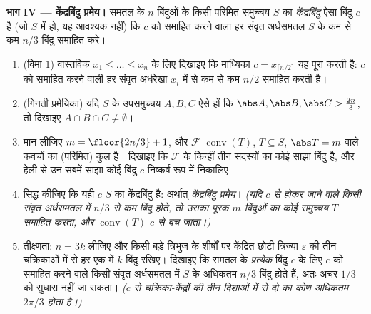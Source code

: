 \begin{problem}
\medskip
\noindent\textbf{भाग IV --- केंद्रबिंदु प्रमेय।} समतल के $n$ बिंदुओं के
किसी परिमित समुच्चय $S$ का \emph{केंद्रबिंदु} ऐसा बिंदु $c$ है (जो $S$ में
हो, यह आवश्यक नहीं) कि $c$ को समाहित करने वाला हर संवृत अर्धसमतल $S$ के कम
से कम $n/3$ बिंदु समाहित करे।
\begin{enumerate}[resume]
  \item (विमा $1$) वास्तविक $x_1 \leq \dots \leq x_n$ के लिए दिखाइए कि माध्यिका $c = x_{\lceil n/2 \rceil}$ यह पूरा
        करती है: $c$ को समाहित करने वाली हर संवृत अर्धरेखा $x_i$ में से कम
        से कम $n/2$ समाहित करती है।
  \item (गिनती प्रमेयिका) यदि $S$ के उपसमुच्चय $A, B, C$ ऐसे हों कि $\abs A, \abs B, \abs C > \tfrac{2n}3$, तो
        दिखाइए $A \cap
        B \cap C \neq \emptyset$।
  \item मान लीजिए $m = \floor{2n/3} + 1$, और $\mathcal F$ $\operatorname{conv}(T)$, $T \subseteq S$, $\abs T =
        m$ वाले  कवचों का
        (परिमित) कुल है। दिखाइए कि $\mathcal F$ के किन्हीं तीन सदस्यों का कोई साझा
        बिंदु है, और हेली से उन सबमें साझा कोई बिंदु $c$ निष्कर्ष रूप में
        निकालिए।
  \item सिद्ध कीजिए कि यही $c$ $S$ का केंद्रबिंदु है: अर्थात्
        \emph{केंद्रबिंदु प्रमेय}। \emph{(यदि $c$ से होकर जाने वाले किसी
        संवृत अर्धसमतल में $n/3$ से कम बिंदु होते, तो उसका  पूरक $m$
        बिंदुओं का कोई समुच्चय $T$ समाहित करता, और $\operatorname{conv}(T)$ $c$ से बच जाता।)}
  \item तीक्ष्णता: $n = 3k$ लीजिए और किसी बड़े त्रिभुज के शीर्षों पर केंद्रित
        छोटी त्रिज्या $\varepsilon$ की तीन चक्रिकाओं में से हर एक में $k$ बिंदु
        रखिए। दिखाइए कि समतल के \emph{प्रत्येक} बिंदु $c$ के लिए $c$ को
        समाहित करने वाले किसी संवृत अर्धसमतल में $S$ के अधिकतम $n/3$ बिंदु
        होते हैं, अतः अचर $1/3$ को सुधारा नहीं जा सकता। \emph{($c$ से
        चक्रिका-केंद्रों की तीन दिशाओं में से दो का कोण अधिकतम $2\pi/3$ होता
        है।)}
\end{enumerate}


\end{problem}
